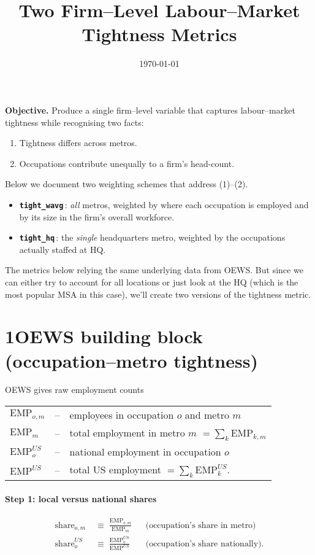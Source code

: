 \documentclass[11pt]{article}
\title{Two Firm--Level Labour--Market Tightness Metrics}
\date{\today}
\begin{document}
\maketitle

\noindent\textbf{Objective.}  Produce a single firm--level variable that
captures labour–market tightness while recognising two facts:
\begin{enumerate}
  \item Tightness differs across metros.
  \item Occupations contribute unequally to a firm’s head-count.
\end{enumerate}
Below we document two weighting schemes that address (1)–(2).

\begin{itemize}
  \item \textbf{\texttt{tight\_wavg}}\,: \emph{all} metros, weighted by
        where each occupation is employed and by its size in the firm’s
        overall workforce.
  \item \textbf{\texttt{tight\_hq}}\,: the \emph{single} headquarters metro,
        weighted by the occupations actually staffed at HQ.
\end{itemize}

The metrics below relying the same underlying data from  OEWS. But since we can either try to account for all locations or just look at the HQ (which is the most popular MSA in this case), we'll create two versions of the tightness metric. 

\section*{1\quad OEWS building block \;(occupation--metro tightness)}

OEWS gives raw employment counts
\begin{center}
\begin{tabular}{@{}ll@{\quad}l@{}}
\(\text{EMP}_{o,m}\) & -- & employees in occupation $o$ and metro $m$ \\
\(\text{EMP}_{m}\)   & -- & total employment in metro $m$  \(=\sum_k \text{EMP}_{k,m}\) \\
\(\text{EMP}^{US}_{o}\) & -- & national employment in occupation $o$  \\
\(\text{EMP}^{US}\) & -- & total US employment  \(=\sum_k \text{EMP}^{US}_{k}\)\;.
\end{tabular}
\end{center}

\paragraph{Step 1: local versus national shares}
\begin{align*}
\text{share}_{o,m}      &\;\equiv\; \frac{\text{EMP}_{o,m}}{\text{EMP}_{m}}        && \text{(occupation's share in metro)}\\[4pt]
\text{share}^{US}_{o}   &\;\equiv\; \frac{\text{EMP}^{US}_{o}}{\text{EMP}^{US}} && \text{(occupation's share nationally).}
\end{align*}
\end{document}
